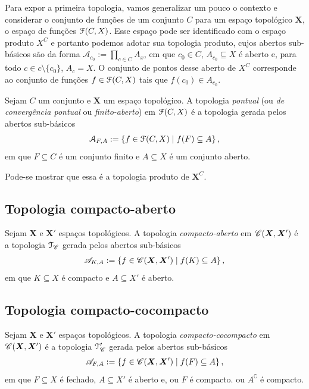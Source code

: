 Para expor a primeira topologia, vamos generalizar um pouco o contexto e considerar o conjunto de funções de um conjunto $C$ para um espaço topológico $\bm X$, o espaço de funções $\mathcal{F}(C,X)$. Esse espaço pode ser identificado com o espaço produto $X^C$ e portanto podemos adotar sua topologia produto, cujos abertos sub-básicos são da forma $\mathcal A_{c_0} := \prod_{c \in C} A_x$, em que $c_0 \in C$, $A_{c_0} \subseteq X$ é aberto e, para todo $c \in c \setminus \{c_0\}$, $A_c = X$. O conjunto de pontos desse aberto de $X^C$ corresponde ao conjunto de funções $f \in \mathcal{F}(C,X)$ tais que $f(c_0) \in A_{c_0}$.

\begin{definition}
Sejam $C$ um conjunto e $\bm X$ um espaço topológico. A topologia \emph{pontual} (ou \emph{de convergência pontual} ou \emph{finito-aberto}) em $\mathcal{F}(C,X)$ é a topologia gerada pelos abertos sub-básicos
	\begin{equation*}
	\mathcal A_{F,A} := \left\{{f \in \mathcal{F}(C,X)}\;\middle\vert\;{f(F) \subseteq A}\right\},
	\end{equation*}
em que $F \subseteq C$ é um conjunto finito e $A \subseteq X$ é um conjunto aberto.
\end{definition}

Pode-se mostrar que essa é a topologia produto de $\bm X^C$.


\subsection{Topologia compacto-aberto}

\begin{definition}
Sejam $\bm X$ e $\bm X'$ espaços topológicos. A topologia \emph{compacto-aberto} em $\mathscr{C}(\bm X,\bm X')$ é a topologia $\mathcal{T}_{\mathscr{C}}$ gerada pelos abertos sub-básicos
	\begin{equation*}
	\mathscr A_{K,A} := \left\{{f \in \mathscr{C}(\bm X,\bm X')}\;\middle\vert\;{f(K) \subseteq A}\right\},
	\end{equation*}
em que $K \subseteq X$ é compacto e $A \subseteq X'$ é aberto.
\end{definition}

\subsection{Topologia compacto-cocompacto}

\begin{definition}
Sejam $\bm X$ e $\bm X'$ espaços topológicos. A topologia \emph{compacto-cocompacto} em $\mathscr{C}(\bm X,\bm X')$ é a topologia $\mathcal{T}'_{\mathscr{C}}$ gerada pelos abertos sub-básicos
	\begin{equation*}
	\mathscr A_{F,A} := \left\{{f \in \mathscr{C}(\bm X,\bm X')}\;\middle\vert\;{f(F) \subseteq A}\right\},
	\end{equation*}
em que $F \subseteq X$ é fechado, $A \subseteq X'$ é aberto e, ou $F$ é compacto. ou $A^\complement$ é compacto.
\end{definition}



